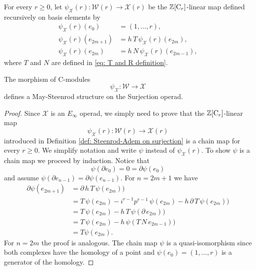 \begin{definition} \label{def: Steenrod-Adem on surjection}
	For every $r \geq 0$, let $\psi_{\mathcal X}(r) \colon \mathcal W(r) \to \mathcal X(r)$ be the $\mathbb{Z}[\mathrm{C}_r]$-linear map defined recursively on basis elements by
	\begin{align*}
	\psi_{\mathcal X}(r)(e_0) & = (1, \dots, r), \\
	\psi_{\mathcal X}(r)(e_{2m+1}) & = h\,T\,\psi_{\mathcal X}(r)(e_{2m}), \\
	\psi_{\mathcal X}(r)(e_{2m}) & = h\,N\,\psi_{\mathcal X}(r)(e_{2m-1}),
	\end{align*}
	where $T$ and $N$ are defined in \eqref{eq: T and R definition}.
\end{definition}

\begin{theorem} \label{thm: Steenrod-Adem on surjection MS convention}
	The morphism of $\mathrm{C}$-modules
	\begin{equation*}
	\psi_{\mathcal X} \colon \mathcal W \to \mathcal X
	\end{equation*}
	defines a May-Steenrod structure on the Surjection operad.
\end{theorem}

\begin{proof}
	Since $\mathcal X$ is an $E_\infty$ operad, we simply need to prove that the $\mathbb{Z}[\mathrm{C}_r]$-linear map
	\begin{equation*}
	\psi_{\mathcal X}(r) \colon \mathcal W(r) \to \mathcal X(r)
	\end{equation*}
	introduced in Definition \ref{def: Steenrod-Adem on surjection} is a chain map for every $r \geq 0$. We simplify notation and write $\psi$ instead of $\psi_{\mathcal X}(r)$. To show $\psi$ is a chain map we proceed by induction. Notice that
	\begin{equation*}
	\psi(\partial e_0) = 0 = \partial \psi(e_0)
	\end{equation*}
	and assume $\psi(\partial e_{n-1}) = \partial \psi(e_{n-1})$. For $n = 2m+1$ we have
	\begin{align*}
	\partial \psi(e_{2m+1}) 
	& =
	\partial\, h\, T\, \psi(e_{2m}) \big) \\
	& =
	T\, \psi(e_{2m}) - i^{r-1} p^{r-1}\, \psi(e_{2m}) -
	h\, \partial\, T\, \psi(e_{2m}) \big) \\
	& =
	T\, \psi(e_{2m}) - 
	h\, T\, \psi(\partial\, e_{2m}) \big) \\
	& =
	T\, \psi(e_{2m}) - 
	h\, \psi(T\,N\, e_{2m-1}) \big) \\
	& = 
	T \psi(e_{2m}).
	\end{align*}
	For $n = 2m$ the proof is analogous. The chain map $\psi$ is a quasi-isomorphism since both complexes have the homology of a point and $\psi(e_0) = (1, \dots, r)$ is a generator of the homology.
\end{proof}


